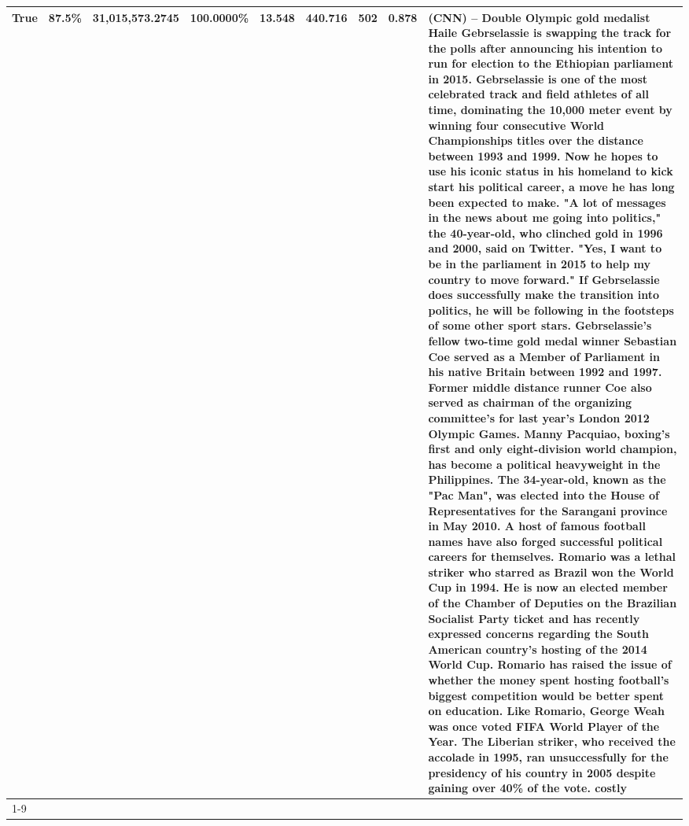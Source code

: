 \begin{table}[H]
{\begin{tabular}{lllrlllll}
True & 87.5\% & 31,015,573.2745 & \bfseries \color{red} 100.0000\% & 13.548 & 440.716 & 502 & 0.878 & (CNN) -- Double Olympic gold medalist Haile Gebrselassie is swapping the track for the polls after announcing his intention to run for election to the Ethiopian parliament in 2015. Gebrselassie is one of the most celebrated track and field athletes of all time, dominating the 10,000 meter event by winning four consecutive World Championships titles over the distance between 1993 and 1999. Now he hopes to use his iconic status in his homeland to kick start his political career, a move he has long been expected to make. "A lot of messages in the news about me going into politics," the 40-year-old, who clinched gold in 1996 and 2000, said on Twitter. "Yes, I want to be in the parliament in 2015 to help my country to move forward." If Gebrselassie does successfully make the transition into politics, he will be following in the footsteps of some other sport stars. Gebrselassie's fellow two-time gold medal winner Sebastian Coe served as a Member of Parliament in his native Britain between 1992 and 1997. Former middle distance runner Coe also served as chairman of the organizing committee's for last year's London 2012 Olympic Games. Manny Pacquiao, boxing's first and only eight-division world champion, has become a political heavyweight in the Philippines. The 34-year-old, known as the "Pac Man", was elected into the House of Representatives for the Sarangani province in May 2010. A host of famous football names have also forged successful political careers for themselves. Romario was a lethal striker who starred as Brazil won the World Cup in 1994. He is now an elected member of the Chamber of Deputies on the Brazilian Socialist Party ticket and has recently expressed concerns regarding the South American country's hosting of the 2014 World Cup. Romario has raised the issue of whether the money spent hosting football's biggest competition would be better spent on education. Like Romario, George Weah was once voted FIFA World Player of the Year. The Liberian striker, who received the accolade in 1995, ran unsuccessfully for the presidency of his country in 2005 despite gaining over 40\% of the vote. costly \\
\cline{1-9}

\end{tabular}}
\end{table}
